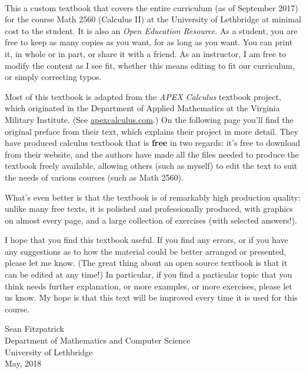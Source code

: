 \thispagestyle{empty}
\Huge
{}\\
\normalsize

This a custom textbook that covers the entire curriculum (as of September 2017) for the course Math 2560 (Calculus II) at the University of Lethbridge at minimal cost to the student. It is also an \emph{Open Education Resource}. As a student, you are free to keep as many copies as you want, for as long as you want. You can print it, in whole or in part, or share it with a friend. As an instructor, I am free to modify the content as I see fit, whether this means editing to fit our curriculum, or simply correcting typos.


Most of this textbook is adapted from the \textit{APEX Calculus} textbook project, which originated in the Department of Applied Mathematics at the Virginia Military Institute. (See \href{http://www.apexcalculus.com}{apexcalculus.com}.) On the following page you'll find the original preface from their text, which explains their project in more detail. They have produced calculus textbook that is \textbf{free} in two regards: it's free to  download from their website, and the authors have made all the files needed to produce the textbook freely available, allowing others (such as myself) to edit the text to suit the needs of various courses (such as Math 2560).

What's even better is that the textbook is of remarkably high production quality: unlike many free texts, it is polished and professionally produced, with graphics on almost every page, and a large collection of exercises (with selected answers!). 

I hope that you find this textbook useful. If you find any errors, or if you have any suggestions as to how the material could be better arranged or presented, please let me know. (The great thing about an open source textbook is that it can be edited at any time!) In particular, if you find a particular topic that you think needs further explanation, or more examples, or more exercises, please let us know. My hope is that this text will be improved every time it is used for this course.

\vspace{1in}

\begin{flushright}
Sean Fitzpatrick\\
Department of Mathematics and Computer Science\\
University of Lethbridge\\
May, 2018
\end{flushright}


